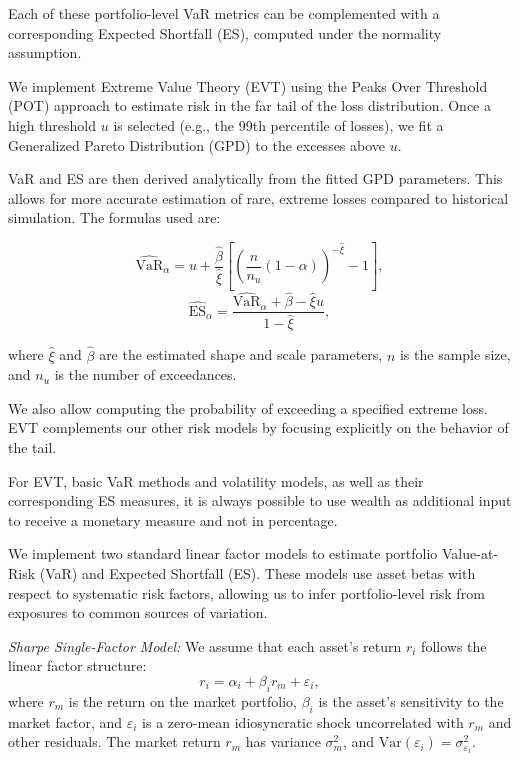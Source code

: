 \documentclass[12pt]{article}
\begin{document}
Each of these portfolio-level VaR metrics can be complemented with a corresponding Expected Shortfall (ES), computed under the normality assumption.


\vspace{1em}
\underline{}

\vspace{0.6em}

We implement Extreme Value Theory (EVT) using the Peaks Over Threshold (POT) approach to estimate risk in the far tail of the loss distribution. Once a high threshold $u$ is selected (e.g., the 99th percentile of losses), we fit a Generalized Pareto Distribution (GPD) to the excesses above $u$.

VaR and ES are then derived analytically from the fitted GPD parameters. This allows for more accurate estimation of rare, extreme losses compared to historical simulation. The formulas used are:

\[
\widehat{\text{VaR}}_\alpha = u + \frac{\hat{\beta}}{\hat{\xi}} \left[ \left( \frac{n}{n_u}(1 - \alpha) \right)^{-\hat{\xi}} - 1 \right],
\]
\[
\widehat{\text{ES}}_\alpha = \frac{\widehat{\text{VaR}}_\alpha + \hat{\beta} - \hat{\xi} u}{1 - \hat{\xi}},
\]

where $\hat{\xi}$ and $\hat{\beta}$ are the estimated shape and scale parameters, $n$ is the sample size, and $n_u$ is the number of exceedances.

We also allow computing the probability of exceeding a specified extreme loss. EVT complements our other risk models by focusing explicitly on the behavior of the tail.

For EVT, basic VaR methods and volatility models, as well as their corresponding ES measures, it is always possible to use wealth as additional input to receive a monetary measure and not in percentage.

\vspace{1em}
\underline{}

\vspace{0.6em}

We implement two standard linear factor models to estimate portfolio Value-at-Risk (VaR) and Expected Shortfall (ES). These models use asset betas with respect to systematic risk factors, allowing us to infer portfolio-level risk from exposures to common sources of variation.

\textit{Sharpe Single-Factor Model:}  
We assume that each asset’s return $r_i$ follows the linear factor structure:
\[
r_i = \alpha_i + \beta_i r_m + \varepsilon_i,
\]
where $r_m$ is the return on the market portfolio, $\beta_i$ is the asset's sensitivity to the market factor, and $\varepsilon_i$ is a zero-mean idiosyncratic shock uncorrelated with $r_m$ and other residuals. The market return $r_m$ has variance $\sigma_m^2$, and $\mathrm{Var}(\varepsilon_i) = \sigma_{\varepsilon_i}^2$.
\end{document}
